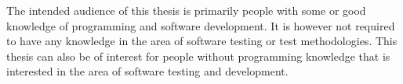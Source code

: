 The intended audience of this thesis is primarily people with some or
good knowledge of programming and software development. It is however
not required to have any knowledge in the area of software testing or
test methodologies. This thesis can also be of interest for people
without programming knowledge that is interested in the area of
software testing and development.\\
